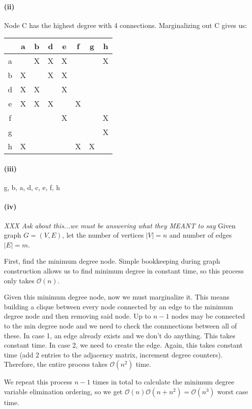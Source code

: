 \documentclass[12pt]{article}
\begin{document}
\paragraph{(ii)}
Node C has the highest degree with 4 connections. Marginalizing out C gives us:

\begin{tabular}{| c || c | c | c | c | c | c | c |}
\hline
& a & b & d & e & f & g & h \\
\hline \hline
a & & X & X & X & & & X \\
\hline
b & X & & X & X & & & \\
\hline
d & X & X & & X & & & \\
\hline
e & X & X & X & & X & & \\
\hline
f & & & & X & & & X  \\
\hline
g & & & & & & & X \\
\hline
h & X & & & & X & X & \\
\hline
\end{tabular}

\paragraph{(iii)}
g, b, a, d, c, e, f, h

\paragraph{(iv)}
\emph{XXX Ask about this...we must be answering what they MEANT to say}
Given graph $G = (V, E)$, let the number of vertices $|V| = n$ and number of
edges $|E| = m$.

First, find the minimum degree node. Simple bookkeeping during graph
construction allows us to find minimum degree in constant time, so this
process only takes $\mathcal{O}(n)$.

Given this minimum degree node, now we must marginalize it. This means building
a clique between every node connected by an edge to the minimum degree node and
then removing said node. Up to $n-1$ nodes may be connected to the min degree
node and we need to check the connnections between all of these. In case 1, an
edge already exists and we don't do anything. This takes constant time. In case
2, we need to create the edge. Again, this takes constant time (add 2 entries
to the adjacency matrix, increment degree counters). Therefore, the entire
process takes $\mathcal{O}(n^2)$ time.

We repeat this process $n-1$ times in total to calculate the minimum degree
variable elimination ordering, so we get $\mathcal{O}(n)\mathcal{O}(n + n^2)
= \mathcal{O}(n^3)$ worst case time.
\end{document}
